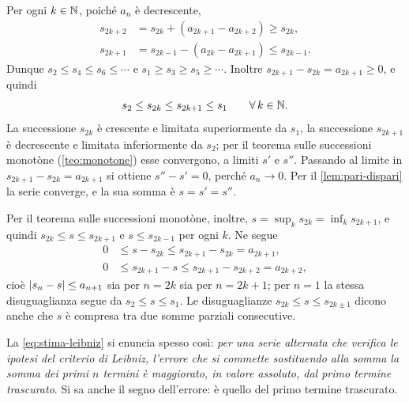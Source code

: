 \begin{dimostrazione}
Per ogni $k\in\mathbb{N}$, poiché $a_{n}$ è decrescente,
\begin{align}
  s_{2k+2}&=s_{2k}+(a_{2k+1}-a_{2k+2})\ge s_{2k} , \label{eq:leibniz-pari}\\
  s_{2k+1}&=s_{2k-1}-(a_{2k}-a_{2k+1})\le s_{2k-1} . \label{eq:leibniz-dispari}
\end{align}
Dunque $s_{2}\le s_{4}\le s_{6}\le\cdots$ e $s_{1}\ge s_{3}\ge s_{5}\ge\cdots$. Inoltre
$s_{2k+1}-s_{2k}=a_{2k+1}\ge0$, e quindi
\begin{equation}\label{eq:leibniz-incapsulati}
  s_{2}\le s_{2k}\le s_{2k+1}\le s_{1} \qquad\forall\, k\in\mathbb{N} .
\end{equation}
La successione $s_{2k}$ è crescente e limitata superiormente da $s_{1}$, la successione
$s_{2k+1}$ è decrescente e limitata inferiormente da $s_{2}$; per il teorema sulle successioni
monotòne (\cref{teo:monotone}) esse convergono, a limiti $s'$ e $s''$. Passando al limite
in $s_{2k+1}-s_{2k}=a_{2k+1}$ si ottiene $s''-s'=0$, perché $a_{n}\to0$. Per il
\cref{lem:pari-dispari} la serie converge, e la sua somma è $s=s'=s''$.

Per il teorema sulle successioni monotòne, inoltre, $s=\sup_{k}s_{2k}=\inf_{k}s_{2k+1}$, e quindi
$s_{2k}\le s\le s_{2k+1}$ e $s\le s_{2k-1}$ per ogni $k$. Ne segue
\begin{align*}
  0&\le s-s_{2k}\le s_{2k+1}-s_{2k}=a_{2k+1} ,\\
  0&\le s_{2k+1}-s\le s_{2k+1}-s_{2k+2}=a_{2k+2} ,
\end{align*}
cioè $\lvert s_{n}-s\rvert\le a_{n+1}$ sia per $n=2k$ sia per $n=2k+1$; per $n=1$ la stessa disuguaglianza
segue da $s_{2}\le s\le s_{1}$. Le disuguaglianze $s_{2k}\le s\le s_{2k\pm1}$ dicono anche che $s$ è
compresa tra due somme parziali consecutive.
\end{dimostrazione}

La \eqref{eq:stima-leibniz} si enuncia spesso così: \emph{per una serie alternata che
verifica le ipotesi del criterio di Leibniz, l'errore che si commette sostituendo alla
somma la somma dei primi $n$ termini è maggiorato, in valore assoluto, dal primo termine
trascurato}. Si sa anche il segno dell'errore: è quello del primo termine trascurato.

